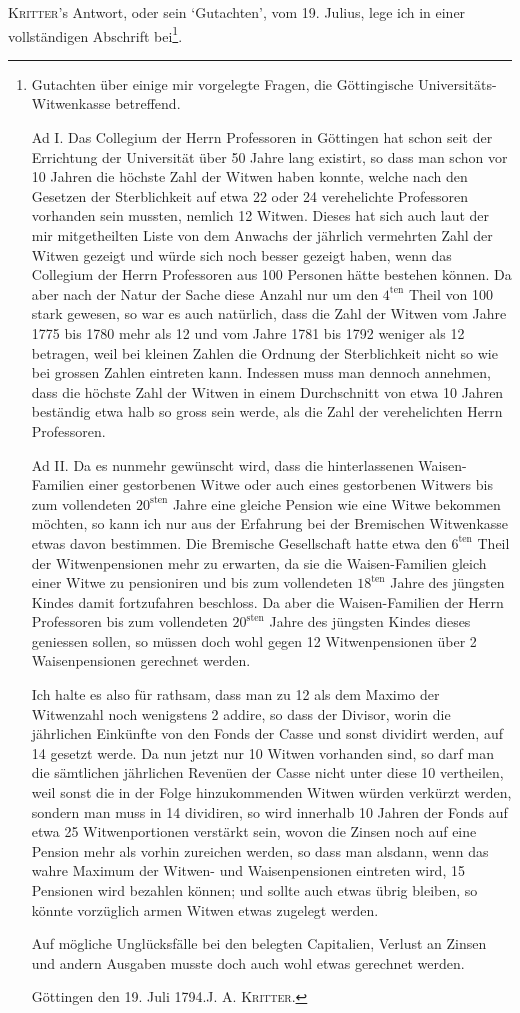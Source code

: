 \textsc{Kritter}’s Antwort, oder sein ‘Gutachten’, vom 19. Julius, lege ich in einer vollständigen Abschrift bei\footnote{Gutachten über einige mir vorgelegte Fragen, die Göttingische Universitäts-Witwenkasse betreffend.

Ad I. Das Collegium der Herrn Professoren in Göttingen hat schon seit der Errichtung der Universität über 50 Jahre lang existirt, so dass man schon vor 10 Jahren die höchste Zahl der Witwen haben konnte, welche nach den Gesetzen der Sterblichkeit auf etwa 22 oder 24 verehelichte Professoren vorhanden sein mussten, nemlich 12 Witwen. Dieses hat sich auch laut der mir mitgetheilten Liste von dem Anwachs der jährlich vermehrten Zahl der Witwen gezeigt und würde sich noch besser gezeigt haben, wenn das Collegium der Herrn Professoren aus 100 Personen hätte bestehen können. Da aber nach der Natur der Sache diese Anzahl nur um den \(4^{\text{ten}}\) Theil von 100 stark gewesen, so war es auch natürlich, dass die Zahl der Witwen vom Jahre 1775 bis 1780 mehr als 12 und vom Jahre 1781 bis 1792 weniger als 12 betragen, weil bei kleinen Zahlen die Ordnung der Sterblichkeit nicht so wie bei grossen Zahlen eintreten kann. Indessen muss man dennoch annehmen, dass die höchste Zahl der Witwen in einem Durchschnitt von etwa 10 Jahren beständig etwa halb so gross sein werde, als die Zahl der verehelichten Herrn Professoren.

Ad II. Da es nunmehr gewünscht wird, dass die hinterlassenen Waisen-Familien einer gestorbenen Witwe oder auch eines gestorbenen Witwers bis zum vollendeten \(20^{\text{sten}}\) Jahre eine gleiche Pension wie eine Witwe bekommen möchten, so kann ich nur aus der Erfahrung bei der Bremischen Witwenkasse etwas davon bestimmen. Die Bremische Gesellschaft hatte etwa den \(6^{\text{ten}}\) Theil der Witwenpensionen mehr zu erwarten, da sie die Waisen-Familien gleich einer Witwe zu pensioniren und bis zum vollendeten \(18^{\text{ten}}\) Jahre des jüngsten Kindes damit fortzufahren beschloss. Da aber die Waisen-Familien der Herrn Professoren bis zum vollendeten \(20^{\text{sten}}\) Jahre des jüngsten Kindes dieses geniessen sollen, so müssen doch wohl gegen 12 Witwenpensionen über 2 Waisenpensionen gerechnet werden.

Ich halte es also für rathsam, dass man zu 12 als dem Maximo der Witwenzahl noch wenigstens 2 addire, so dass der Divisor, worin die jährlichen Einkünfte von den Fonds der Casse und sonst dividirt werden, auf 14 gesetzt werde. Da nun jetzt nur 10 Witwen vorhanden sind, so darf man die sämtlichen jährlichen Revenüen der Casse nicht unter diese 10 vertheilen, weil sonst die in der Folge hinzukommenden Witwen würden verkürzt werden, sondern man muss in 14 dividiren, so wird innerhalb 10 Jahren der Fonds auf etwa 25 Witwenportionen verstärkt sein, wovon die Zinsen noch auf eine Pension mehr als vorhin zureichen werden, so dass man alsdann, wenn das wahre Maximum der Witwen- und Waisenpensionen eintreten wird, 15 Pensionen wird bezahlen können; und sollte auch etwas übrig bleiben, so könnte vorzüglich armen Witwen etwas zugelegt werden.

Auf mögliche Unglücksfälle bei den belegten Capitalien, Verlust an Zinsen und andern Ausgaben musste doch auch wohl etwas gerechnet werden.

Göttingen den 19. Juli 1794.\hfill J. A. \textsc{Kritter}.}.
